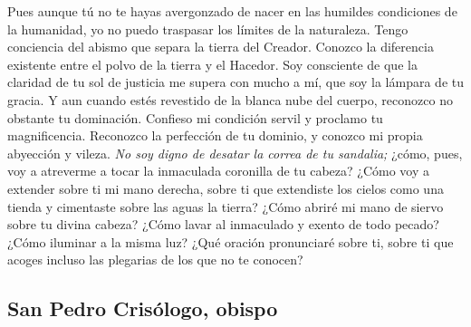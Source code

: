 \begin{body}
				Pues aunque tú no te hayas avergonzado de nacer en las humildes condiciones de la humanidad, yo no puedo traspasar los límites de la naturaleza. Tengo conciencia del abismo que separa la tierra del Creador. Conozco la diferencia existente entre el polvo de la tierra y el Hacedor. Soy consciente de que la claridad de tu sol de justicia me supera con mucho a mí, que soy la lámpara de tu gracia. Y aun cuando estés revestido de la blanca nube del cuerpo, reconozco no obstante tu dominación. Confieso mi condición servil y proclamo tu magnificencia. Reconozco la perfección de tu dominio, y conozco mi propia abyección y vileza. \emph{No soy digno de desatar la correa de tu sandalia;} ¿cómo, pues, voy a atreverme a tocar la inmaculada coronilla de tu cabeza? ¿Cómo voy a extender sobre ti mi mano derecha, sobre ti que extendiste los cielos como una tienda y cimentaste sobre las aguas la tierra? ¿Cómo abriré mi mano de siervo sobre tu divina cabeza? ¿Cómo lavar al inmaculado y exento de todo pecado? ¿Cómo iluminar a la misma luz? ¿Qué oración pronunciaré sobre ti, sobre ti que acoges incluso las plegarias de los que no te conocen?
			\end{body}

\newsection

		\subsection{San Pedro Crisólogo, obispo}
		
			
			
